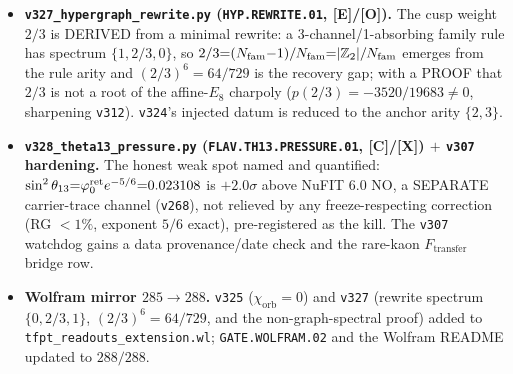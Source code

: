 \documentclass[11pt]{article}
\providecommand{\mE}{\textbf{[E]}}\providecommand{\mC}{\textbf{[C]}}
\providecommand{\mO}{\textbf{[O]}}\providecommand{\mX}{\textbf{[X]}}
\begin{document}
\begin{itemize}
  Only $F_{\mathrm{pole}}$ carries the seam rate; the four external rates are honestly fenced (\texttt{v187}/\texttt{v303}).
\item \textbf{\texttt{v327\_hypergraph\_rewrite.py} (\texttt{HYP.REWRITE.01}, \mE/\mO).} The cusp weight $2/3$ is
  DERIVED from a minimal rewrite: a 3-channel/1-absorbing family rule has spectrum $\{1,2/3,0\}$, so
  $2/3{=}(N_{\mathrm{fam}}{-}1)/N_{\mathrm{fam}}{=}|\mathbb{Z}_2|/N_{\mathrm{fam}}$ emerges from the rule arity and $(2/3)^6{=}64/729$ is the recovery gap;
  with a PROOF that $2/3$ is not a root of the affine-$E_8$ charpoly ($p(2/3){=}-3520/19683\ne0$, sharpening \texttt{v312}).
  \texttt{v324}'s injected datum is reduced to the anchor arity $\{2,3\}$.
\item \textbf{\texttt{v328\_theta13\_pressure.py} (\texttt{FLAV.TH13.PRESSURE.01}, \mC/\mX) $+$ \texttt{v307}
  hardening.} The honest weak spot named and quantified: $\sin^2\theta_{13}{=}\varphi_0^{\mathrm{ret}} e^{-5/6}{=}0.023108$ is
  $+2.0\sigma$ above NuFIT 6.0 NO, a SEPARATE carrier-trace channel (\texttt{v268}), not relieved by any
  freeze-respecting correction (RG $<1\%$, exponent $5/6$ exact), pre-registered as the kill.  The \texttt{v307}
  watchdog gains a data provenance/date check and the rare-kaon $F_{\mathrm{transfer}}$ bridge row.
\item \textbf{Wolfram mirror $285\to288$.} \texttt{v325} ($\chi_{\mathrm{orb}}{=}0$) and \texttt{v327} (rewrite
  spectrum $\{0,2/3,1\}$, $(2/3)^6{=}64/729$, and the non-graph-spectral proof) added to
  \texttt{tfpt\_readouts\_extension.wl}; \texttt{GATE.WOLFRAM.02} and the Wolfram README updated to $288/288$.
\end{itemize}
\end{document}
